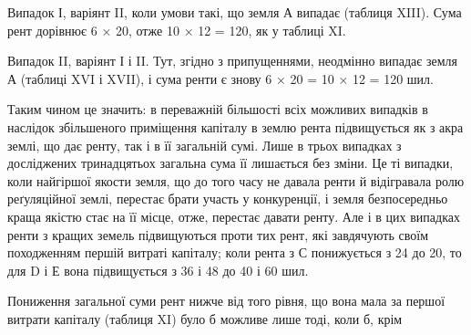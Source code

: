 Випадок І, варіянт II, коли умови такі, що земля А випадає (таблиця XIII).
Сума рент дорівнює 6 × 20, отже 10 × 12 = 120, як у таблиці XI.

Випадок II, варіянт І і II. Тут, згідно з припущеннями, неодмінно випадає
земля А (таблиці XVI і XVII), і сума ренти є знову 6 × 20 = 10 × 12 =
120 шил.

Таким чином це значить: в переважній більшості всіх можливих випадків
в наслідок збільшеного приміщення капіталу в землю рента підвищується як
з акра землі, що дає ренту, так і в її загальній сумі. Лише в трьох випадках
з досліджених тринадцятьох загальна сума її лишається без зміни. Це ті випадки,
коли найгіршої якости земля, що до того часу не давала ренти й відігравала
ролю реґуляційної землі, перестає брати участь у конкуренції, і земля безпосередньо
краща якістю стає на її місце, отже, перестає давати ренту. Але і в
цих випадках ренти з кращих земель підвищуються проти тих рент, які завдячують
своїм походженням першій витраті капіталу; коли рента з С понижується
з 24 до 20, то для D і Е вона підвищується з 36 і 48 до 40 і 60 шил.

Пониження загальної суми рент нижче від того рівня, що вона мала за
першої витрати капіталу (таблиця XI) було б можливе лише тоді, коли б, крім
